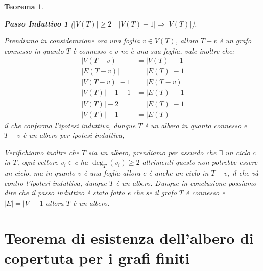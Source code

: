 \documentclass{article}
\makeatletter
\renewenvironment{proof}[1][\proofname]{\par
    \pushQED{\qed}%
    \normalfont \topsep6\p@\@plus6\p@\relax
    \trivlist
    \item\relax
    {\itshape
    #1\@addpunct{.}}\hspace\labelsep\ignorespaces
    }{%
    \popQED\endtrivlist\@endpefalse
}
\newtheorem{theorem}{Teorema}[part]
\theoremstyle{definition}
\newtheorem*{step}{Passo Induttivo}
\makeatother
\begin{document}
\begin{theorem}
\begin{proof}
\begin{enumerate}
\begin{step}[$|V(T)|\geq2\quad |V(T)-1|\Longrightarrow |V(T)|$]
\begin{proof}
                            \end{proof}
                            Prendiamo in considerazione ora una foglia \(v\in V(T)\), allora \(T-v\) è un grafo connesso in quanto \(T\) è connesso e \(v\) ne è una sua foglia, vale inoltre che: \[
                                \begin{aligned}
                                    |V(T-v)|&=|V(T)|-1\\
                                    |E(T-v)|&=|E(T)|-1\\
                                    |V(T-v)|-1&=|E(T-v)|\\
                                    |V(T)|-1-1&=|E(T)|-1\\
                                    |V(T)|-2&=|E(T)|-1\\
                                    |V(T)|-1&=|E(T)|
                                \end{aligned} 
                            \]
                            il che conferma l'ipotesi induttiva, dunque \(T\) è un albero in quanto connesso e \(T-v\) è un albero per ipotesi induttiva,
                            \popQED{}
                        \end{step}
                        \begin{proof}[]
                            Verifichiamo inoltre che \(T\) sia un albero, prendiamo per assurdo che \(\exists\) un ciclo \(c\) in \(T\), ogni vettore \(v_i\in c\) ha \(\deg_T(v_i)\geq 2\) altrimenti questo non potrebbe essere un ciclo, ma in quanto \(v\) è una foglia allora \(c\) è anche un ciclo in \(T-v\), il che và contro l'ipotesi induttiva, dunque \(T\) è un albero.
                        \end{proof}
                        Dunque in conclusione possiamo dire che il passo induttivo è stato fatto e che se il grafo \(T\) è connesso e \(|E|=|V|-1\) allora \(T\) è un albero.
                \end{enumerate}
                \pushQED{}
            \end{proof}
            \raggedleft{{\ensuremath{\blacksquare}}}
        \end{theorem}
\part{Teorema di esistenza dell'albero di copertuta per i grafi finiti}
\end{document}
